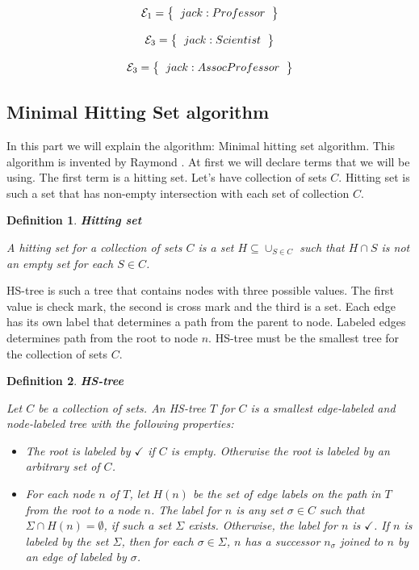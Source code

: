 \documentclass[12pt,a4paper]{article}
\newtheorem{definition}{Definition}[subsection]
\begin{document}
\[ 
\mathcal{E}_{1} = \left\{
\begin{tabular}{c c}
	$jack : Professor$ \\
\end{tabular}
\right \}
\]

\[ 
\mathcal{E}_{3} = \left\{
\begin{tabular}{c c}
	$jack : Scientist$ \\
\end{tabular}
\right \}
\]

\[ 
\mathcal{E}_{3} = \left\{
\begin{tabular}{c c}
	$jack : AssocProfessor$ \\
\end{tabular}
\right \}
\]

\subsection{Minimal Hitting Set algorithm}
In this part we will explain the algorithm: Minimal hitting set algorithm. This algorithm is invented by Raymond \cite{reiterHS}. At first we will declare terms that we will be using. The first term is a hitting set. Let's have collection of sets $C$. Hitting set is such a set that has non-empty intersection with each set of collection $C$.

\begin{definition}{\textbf{Hitting set}}
	
	A hitting set for a collection of sets $C$ is a set $H \subseteq \cup_{S \in C}$ such that $H \cap S$ is not an empty set for each $S \in C$.
\end{definition}

HS-tree is such a tree that contains nodes with three possible values. The first value is check mark, the second is cross mark and the third is a set. Each edge has its own label that determines a path from the parent to node. Labeled edges determines path from the root to node $n$. HS-tree must be the smallest tree for the collection of sets $C$.

\begin{definition}{\textbf{HS-tree}}
	
	Let $C$ be a collection of sets. An HS-tree $T$ for $C$ is a smallest edge-labeled and node-labeled tree with the following properties:
	
	\begin{itemize}
		\item The root is labeled by $\checkmark$ if $C$ is empty. Otherwise the root is labeled by an arbitrary set of $C$.
		
		\item For each node $n$ of $T$, let $H(n)$ be the set of edge labels on the path in $T$ from the root to a node $n$. The label for $n$ is any set $\sigma \in C$ such that $\Sigma \cap H(n) = \emptyset$, if such a set $\Sigma$ exists. Otherwise, the label for $n$ is $\checkmark$. If $n$ is labeled by the set $\Sigma$, then for each $\sigma \in \Sigma$, $n$ has a successor $n_{\sigma}$ joined to $n$ by an edge of labeled by $\sigma$.
	\end{itemize}
\end{definition}
\end{document}
